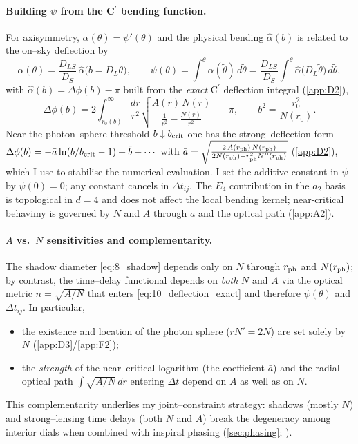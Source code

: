 \documentclass{iopjournal}
\begin{document}
\paragraph{Building $\psi$ from the C$^\prime$ bending function.}
For axisymmetry, $\alpha(\theta)=\psi'(\theta)$ and the physical bending $\hat\alpha(b)$ is related to the on–sky deflection by
\begin{equation}
\alpha(\theta)=\frac{D_{LS}}{D_S}\,\hat\alpha\big(b=D_L\theta\big),
\qquad
\psi(\theta)=\int^{\theta}\!\alpha(\tilde\theta)\,d\tilde\theta
=\frac{D_{LS}}{D_S}\int^{\theta}\!\hat\alpha\!\big(D_L\tilde\theta\big)\,d\tilde\theta,
\label{eq:10_psi_from_alpha}
\end{equation}
with $\hat\alpha(b)=\Delta\phi(b)-\pi$ built from the \emph{exact} C$^\prime$ deflection integral (\cref{app:D2}),
\begin{equation}
\Delta\phi(b)=2\int_{r_0(b)}^\infty\frac{dr}{r^2}
\sqrt{\frac{A(r)\,N(r)}{\displaystyle \frac{1}{b^{2}}-\frac{N(r)}{r^{2}}}}\;-\;\pi,
\qquad b^2=\frac{r_0^2}{N(r_0)}.
\label{eq:10_deflection_exact}
\end{equation}
Near the photon–sphere threshold $b\downarrow b_{\rm crit}$ one has the strong–deflection form
$\Delta\phi(b)=-\bar a\ln(b/b_{\rm crit}-1)+\bar b+\cdots$ with
$\bar a=\sqrt{\frac{2\,A(r_{\rm ph})\,N(r_{\rm ph})}{2N(r_{\rm ph})-r_{\rm ph}^{2}N''(r_{\rm ph})}}$ (\cref{app:D2}), which I use to stabilise the numerical evaluation. I set the additive constant in $\psi$ by $\psi(0)=0$; any constant cancels in $\Delta t_{ij}$. The $E_4$ contribution in the $a_2$ basis is topological in $d=4$ and does not affect the local bending kernel; near-critical behavimy is governed by $N$ and $A$ through $\bar a$ and the optical path (\cref{app:A2}).


\paragraph{$A$ vs.\ $N$ sensitivities and complementarity.}
The shadow diameter \eqref{eq:8_shadow} depends only on $N$ through $r_{\rm ph}$ and $N(r_{\rm ph})$; by contrast, the time–delay functional depends on \emph{both} $N$ and $A$ via the optical metric $n=\sqrt{A/N}$ that enters \eqref{eq:10_deflection_exact} and therefore $\psi(\theta)$ and $\Delta t_{ij}$. In particular,
\begin{itemize}
\item the existence and location of the photon sphere ($rN'=2N$) are set solely by $N$ (\cref{app:D3}/\cref{app:F2});
\item the \emph{strength} of the near–critical logarithm (the coefficient $\bar a$) and the radial optical path $\int\sqrt{A/N}\,dr$ entering $\Delta t$ depend on $A$ as well as on $N$.
\end{itemize}
This complementarity underlies my joint–constraint strategy: shadows (mostly $N$) and strong–lensing time delays (both $N$ and $A$) break the degeneracy among interior dials when combined with inspiral phasing (\cref{sec:phasing}; ).
\end{document}
